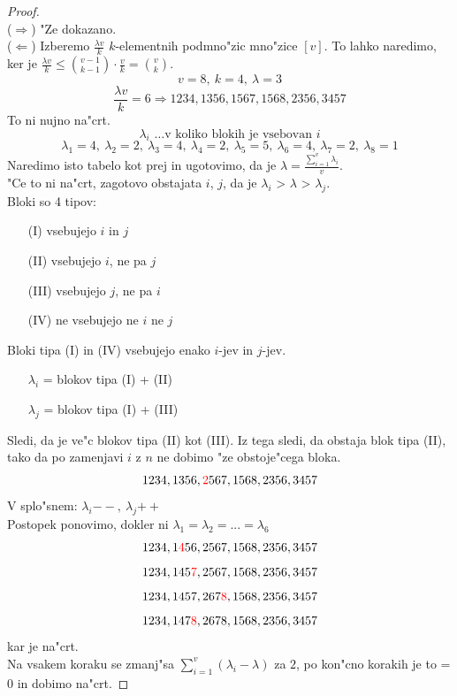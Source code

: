 \documentclass[a4paper,12pt]{article}
\theoremstyle{definition}
\theoremstyle{remark}
\begin{document}
\begin{proof}\mbox{}\\
	($\Rightarrow$) "Ze dokazano.\\
	($\Leftarrow$) Izberemo $\frac{\lambda v}{k}$ $k$-elementnih podmno"zic mno"zice $[v]$. To lahko naredimo, ker je $\frac{\lambda v}{k} \leqslant \binom{v - 1}{k - 1}\cdot \frac{v}{k} = \binom{v}{k}$.\\

	\[v = 8, \ k = 4, \ \lambda = 3\]
	\[\frac{\lambda v}{k} = 6  \Rightarrow 1234, 1356, 1567, 1568, 2356, 3457\]
	To ni nujno na"crt.
	\[\lambda_i \text{ \ldots v koliko blokih je vsebovan }i\]
	\[\lambda_1 = 4,\ \lambda_2 = 2,\ \lambda_3 = 4,\ \lambda_4 = 2,\ \lambda_5 = 5,\ \lambda_6 = 4,\ \lambda_7 = 2,\ \lambda_8 = 1\]
	Naredimo isto tabelo kot prej in ugotovimo, da je $\lambda = \frac{\sum_{i = 1}^v \lambda_i}{v}$.\\
	"Ce to ni na"crt, zagotovo obstajata $i$, $j$, da je $\lambda_i$ > $\lambda$ > $\lambda_j$.\\

	Bloki so 4 tipov:
	\begin{itemize}
	    \item[(I)] vsebujejo $i$ in $j$
	    \item[(II)] vsebujejo $i$, ne pa $j$
	    \item[(III)] vsebujejo $j$, ne pa $i$
	    \item[(IV)] ne vsebujejo ne $i$ ne $j$\\
	\end{itemize}

	Bloki tipa (I) in (IV) vsebujejo enako $i$-jev in $j$-jev.
	\begin{itemize}
	    \item[] $\lambda_i$ = blokov tipa (I) + (II)
	    \item[] $\lambda_j$ = blokov tipa (I) + (III)
	\end{itemize}
	Sledi, da je ve"c blokov tipa (II) kot (III). Iz tega sledi, da obstaja blok tipa (II), tako da po zamenjavi $i$ z $n$ ne dobimo "ze obstoje"cega bloka.\\
	\[ 1234, 1356, \textcolor{red}{2}567, 1568, 2356, 3457 \]
	V splo"snem: $\lambda_i\!\mathrel{--},\ \lambda_j\!\mathrel{++}$\\
	Postopek ponovimo, dokler ni $\lambda_1 = \lambda_2 = ... = \lambda_6$
	\[1234, 1\textcolor{red}{4}56, 2567, 1568, 2356, 3457\]
	\[1234, 145\textcolor{red}{7}, 2567, 1568, 2356, 3457\]
	\[1234, 1457, 267\textcolor{red}{8}, 1568, 2356, 3457\]
	\[1234, 147\textcolor{red}{8}, 2678, 1568, 2356, 3457\]
	kar je na"crt.\\
	Na vsakem koraku se zmanj"sa $\displaystyle \sum_{i = 1}^v (\lambda_i - \lambda)$ za $2$, po kon"cno korakih je to = $0$ in dobimo na"crt.
\end{proof}
\end{document}
